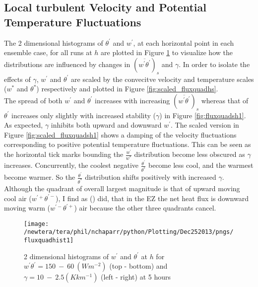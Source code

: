 \clearpage

\subsection{Local turbulent Velocity and Potential Temperature Fluctuations}
\label{subsec:fluxquadrants}     
\FloatBarrier

The 2 dimensional histograms of $\theta^{'}$ and $w^{'}$, at each horizontal point in each ensemble case, for all runs at $h$ are plotted in Figure \ref{fig:fluxquadsh} to visualize how the distributions are influenced by changes in $(\overline{w^{'} \theta^{'}})_{s}$ and $\gamma$.  In order to isolate the effects of $\gamma$,  $w^{'}$ and $\theta^{'}$ are scaled by the convecitve velocity and temperature scales ($w^{*}$ and $\theta^{*}$) respectively and plotted in Figure \ref{fig:scaled_fluxquadhs}.\\

The spread of both $w^{'}$ and $\theta^{'}$ increases with increasing $(\overline{w^{'}\theta^{'}})_{s}$ whereas that of $\theta^{'}$ increases only slightly with increased stability ($\gamma$) in Figure \ref{fig:fluxquadsh1}.  As expected, $\gamma$ inhibits both upward and downward $w^{'}$. The scaled version in Figure \ref{fig:scaled_fluxquadsh1} shows a damping of the velocity fluctuations corresponding to positive potential temperature fluctuations.  This can be seen as the horizontal tick marks bounding the $\frac{w^{'}}{w^{*}}$ distribution become less obscured as $\gamma$ increases.  Concurrently, the coolest negative $\frac{\theta^{'}}{\theta^{*}}$ become less cool, and the warmest become warmer.  So the $\frac{\theta^{'}}{\theta^{*}}$ distribution shifts positively with increased $\gamma$.\\ 

Although the quadrant of overall largest magnitude is that of upward moving cool air ($w^{'+}\theta^{'-}$), I find as \citeauthor{SullMoengStev} (\citeyear{SullMoengStev}) did,  that in the \acs{EZ} the net heat flux is downward moving warm ($w^{'-}\theta^{'+}$) air because the other three quadrants cancel.\


\begin{figure}[htbp]
\centering
 \texttt{[image: /newtera/tera/phil/nchaparr/python/Plotting/Dec252013/pngs/fluxquadhist1]}                 
\caption[2D distributions of $w^{'}$ and $\theta^{'}$ for all runs]{ 2 dimensional histograms of $w^{'}$ and $\theta^{'}$ at $h$ for $w^{'}\theta^{'} = 150 \ - \ 60\ (Wm^{-2})$ (top - bottom) and $\gamma = 10 \ - \  2.5 (Kkm^{-1})$ (left - right) at 5 hours}
\label{fig:fluxquadsh}
\end{figure}

